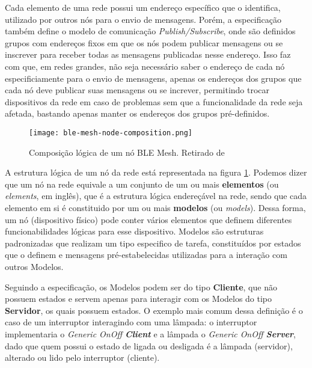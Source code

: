 \documentclass[../monografia.tex]{subfiles}
\begin{document}
Cada elemento de uma rede possui um endereço específico que o identifica, utilizado por outros nós para o envio de mensagens. Porém, a especificação também define o modelo de comunicação \textit{Publish/Subscribe}, onde são definidos grupos com endereços fixos em que os nós podem publicar mensagens ou se inscrever para receber todas as mensagens publicadas nesse endereço. Isso faz com que, em redes grandes, não seja necessário saber o endereço de cada nó especificiamente para o envio de mensagens, apenas os endereços dos grupos que cada nó deve publicar suas mensagens ou se increver, permitindo trocar dispositivos da rede em caso de problemas sem que a funcionalidade da rede seja afetada, bastando apenas manter os endereços dos grupos pré-definidos.

\begin{figure}[h!]
	\centering
	\texttt{[image: ble-mesh-node-composition.png]}
	\caption{Composição lógica de um nó BLE Mesh. Retirado de \cite{ble-mesh-models}}
	\label{fig:ble-mesh-node-composition}
\end{figure}

A estrutura lógica de um nó da rede está representada na figura \ref{fig:ble-mesh-node-composition}. Podemos dizer que um nó na rede equivale a um conjunto de um ou mais \textbf{elementos} (ou \textit{elements}, em inglês), que é a estrutura lógica endereçável na rede, sendo que cada elemento em si é constituido por um ou mais \textbf{modelos} (ou \textit{models}). Dessa forma, um nó (dispositivo físico) pode conter vários elementos que definem diferentes funcionabilidades lógicas para esse dispositivo. Modelos são estruturas padronizadas que realizam um tipo especifico de tarefa, constituídos por estados que o definem e mensagens pré-estabelecidas utilizadas para a interação com outros Modelos.

Seguindo a especificação, os Modelos podem ser do tipo \textbf{Cliente}, que não possuem estados e servem apenas para interagir com os Modelos do tipo \textbf{Servidor}, os quais possuem estados. O exemplo mais comum dessa definição é o caso de um interruptor interagindo com uma lâmpada: o interruptor implementaria o \textit{Generic OnOff \textbf{Client}} e a lâmpada o \textit{Generic OnOff \textbf{Server}}, dado que quem possui o estado de ligada ou desligada é a lâmpada (servidor), alterado ou lido pelo interruptor (cliente).
\end{document}
